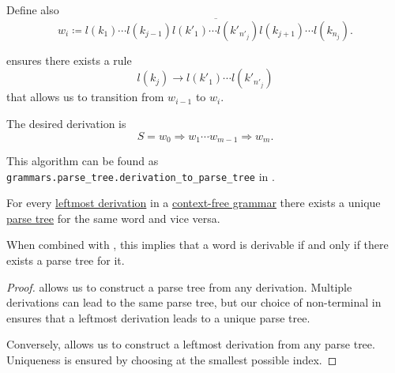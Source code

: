 \begin{algorithm}
\begin{thmenum}
\begin{itemize}
      Define also
      \begin{equation*}
        w_i \coloneqq l(k_1) \cdots l(k_{j-1}) \overline{ l(k'_1) \cdots l(k'_{n'_j}) } l(k_{j+1}) \cdots l(k_{n_j}).
      \end{equation*}

       ensures there exists a rule
      \begin{equation*}
        l(k_j) \to l(k'_1) \cdots l(k'_{n'_j})
      \end{equation*}
      that allows us to transition from \( w_{i-1} \) to \( w_i \).
    \end{itemize}

     The desired derivation is
    \begin{equation*}
      S = w_0 \Rightarrow w_1 \cdots w_{m-1} \Rightarrow w_m.
    \end{equation*}
  \end{thmenum}
\end{algorithm}
\begin{comments}
  \item This algorithm can be found as \texttt{grammars.parse\_tree.derivation\_to\_parse\_tree} in \cite{code}.
\end{comments}

\begin{proposition}\label{thm:derivations_and_parse_trees}
  For every \hyperref[def:leftmost_derivation]{leftmost derivation} in a \hyperref[def:chomsky_hierarchy/context_free]{context-free grammar} there exists a unique \hyperref[def:parse_tree]{parse tree} for the same word and vice versa.
\end{proposition}
\begin{comments}
  \item When combined with , this implies that a word is derivable if and only if there exists a parse tree for it.
\end{comments}
\begin{proof}
   allows us to construct a parse tree from any derivation. Multiple derivations can lead to the same parse tree, but our choice of non-terminal in  ensures that a leftmost derivation leads to a unique parse tree.

  Conversely,  allows us to construct a leftmost derivation from any parse tree. Uniqueness is ensured by choosing at  the smallest possible index.
\end{proof}

